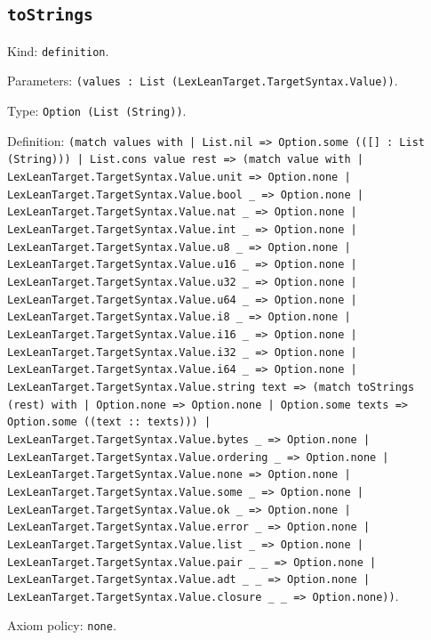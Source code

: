 \documentclass[11pt]{article}
\begin{document}
\subsection*{\texttt{toStrings}}
\noindent Kind: \texttt{definition}.\par
\noindent Parameters: \texttt{(values : List (LexLeanTarget.TargetSyntax.Value))}.\par
\noindent Type: \texttt{Option (List (String))}.\par
\noindent Definition: \texttt{(match values with | List.nil => Option.some (([] : List (String))) | List.cons value rest => (match value with | LexLeanTarget.TargetSyntax.Value.unit => Option.none | LexLeanTarget.TargetSyntax.Value.bool \_ => Option.none | LexLeanTarget.TargetSyntax.Value.nat \_ => Option.none | LexLeanTarget.TargetSyntax.Value.int \_ => Option.none | LexLeanTarget.TargetSyntax.Value.u8 \_ => Option.none | LexLeanTarget.TargetSyntax.Value.u16 \_ => Option.none | LexLeanTarget.TargetSyntax.Value.u32 \_ => Option.none | LexLeanTarget.TargetSyntax.Value.u64 \_ => Option.none | LexLeanTarget.TargetSyntax.Value.i8 \_ => Option.none | LexLeanTarget.TargetSyntax.Value.i16 \_ => Option.none | LexLeanTarget.TargetSyntax.Value.i32 \_ => Option.none | LexLeanTarget.TargetSyntax.Value.i64 \_ => Option.none | LexLeanTarget.TargetSyntax.Value.string text => (match toStrings (rest) with | Option.none => Option.none | Option.some texts => Option.some ((text :: texts))) | LexLeanTarget.TargetSyntax.Value.bytes \_ => Option.none | LexLeanTarget.TargetSyntax.Value.ordering \_ => Option.none | LexLeanTarget.TargetSyntax.Value.none => Option.none | LexLeanTarget.TargetSyntax.Value.some \_ => Option.none | LexLeanTarget.TargetSyntax.Value.ok \_ => Option.none | LexLeanTarget.TargetSyntax.Value.error \_ => Option.none | LexLeanTarget.TargetSyntax.Value.list \_ => Option.none | LexLeanTarget.TargetSyntax.Value.pair \_ \_ => Option.none | LexLeanTarget.TargetSyntax.Value.adt \_ \_ => Option.none | LexLeanTarget.TargetSyntax.Value.closure \_ \_ => Option.none))}.\par
\noindent Axiom policy: \texttt{none}.\par
\end{document}
